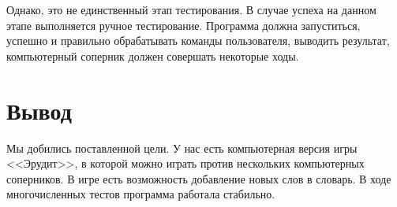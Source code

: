 \documentclass[a4paper,14pt]{article}
\begin{document}
	Однако, это не единственный этап тестирования.
	В случае успеха на данном этапе выполняется ручное тестирование.
	Программа должна запуститься, успешно и правильно обрабатывать команды пользователя, выводить результат, компьютерный соперник должен совершать некоторые ходы.
	
\section{Вывод}
	Мы добились поставленной цели.
	У нас есть компьютерная версия игры <<Эрудит>>, в которой можно играть против нескольких компьютерных соперников.
	В игре есть возможность добавление новых слов в словарь.
	В ходе многочисленных тестов программа работала стабильно.
	
\printbibliography[env=gostbibliography,sorting=ntvy]
\end{document}
